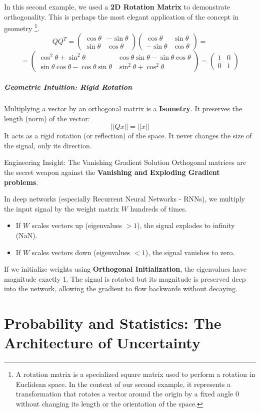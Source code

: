 \documentclass[12pt,a4paper,twoside,openright]{book}
\begin{document}
In this second example, we used a \textbf{2D Rotation Matrix} to demonstrate orthogonality. This is perhaps the most elegant application of the concept in geometry \footnote{A rotation matrix is a specialized square matrix used to perform a rotation in Euclidean space. In the context of our second example, it represents a transformation that rotates a vector around the origin by a fixed angle $0$ without changing its length or the orientation of the space.}.
$$
Q Q^T = 
\begin{pmatrix} \cos\theta & -\sin\theta \\ \sin\theta & \cos\theta \end{pmatrix}
\begin{pmatrix} \cos\theta & \sin\theta \\ -\sin\theta & \cos\theta \end{pmatrix} = 
$$
$$
= \begin{pmatrix} 
\cos^2\theta + \sin^2\theta & \cos\theta\sin\theta - \sin\theta\cos\theta \\ 
\sin\theta\cos\theta - \cos\theta\sin\theta & \sin^2\theta + \cos^2\theta 
\end{pmatrix} =
\begin{pmatrix} 1 & 0 \\ 0 & 1 \end{pmatrix}
$$

\paragraph{Geometric Intuition: Rigid Rotation}
Multiplying a vector by an orthogonal matrix is a \textbf{Isometry}. It preserves the length (norm) of the vector:
\[ ||Qx|| = ||x|| \]
It acts as a rigid rotation (or reflection) of the space. It never changes the size of the signal, only its direction.

\begin{unibobox}{Engineering Insight: The Vanishing Gradient Solution}
Orthogonal matrices are the secret weapon against the \textbf{Vanishing and Exploding Gradient problems}.

In deep networks (especially Recurrent Neural Networks - RNNs), we multiply the input signal by the weight matrix $W$ hundreds of times.
\begin{itemize}
    \item If $W$ scales vectors up (eigenvalues $> 1$), the signal explodes to infinity (NaN).
    \item If $W$ scales vectors down (eigenvalues $< 1$), the signal vanishes to zero.
\end{itemize}

If we initialize weights using \textbf{Orthogonal Initialization}, the eigenvalues have magnitude exactly 1. The signal is rotated but its magnitude is preserved deep into the network, allowing the gradient to flow backwards without decaying.
\end{unibobox}


\chapter{Probability and Statistics: The Architecture of Uncertainty}
\end{document}
